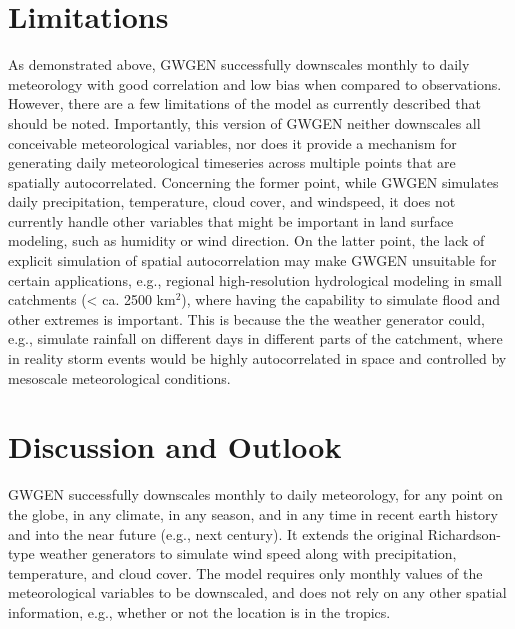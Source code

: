 \documentclass[
11pt, %
english, %
singlespacing, %
headsepline, %
]{MastersDoctoralThesis} %
\begin{document}
\begin{NoHyper}
\begin{refsection}
\section{Limitations} \label{sec:limits}
As demonstrated above, GWGEN successfully downscales monthly to daily meteorology with good correlation and low bias when compared to observations. However, there are a few limitations of the model as currently described that should be noted. Importantly, this version of GWGEN neither downscales all conceivable meteorological variables, nor does it provide a mechanism for generating daily meteorological timeseries across multiple points that are spatially autocorrelated. Concerning the former point, while GWGEN simulates daily precipitation, temperature, cloud cover, and windspeed, it does not currently handle other variables that might be important in land surface modeling, such as humidity or wind direction. On the latter point, the lack of explicit simulation of spatial autocorrelation may make GWGEN unsuitable for certain applications, e.g., regional high-resolution hydrological modeling in small catchments (< ca. 2500 km$^2$), where having the capability to simulate flood and other extremes is important. This is because the the weather generator could, e.g., simulate rainfall on different days in different parts of the catchment, where in reality storm events would be highly autocorrelated in space and controlled by mesoscale meteorological conditions.

\section{Discussion and Outlook} \label{sec:discussion}
GWGEN successfully downscales monthly to daily meteorology, for any point on the globe, in any climate, in any season, and in any time in recent earth history and into the near future (e.g., next century). It extends the original Richardson-type weather generators to simulate wind speed along with precipitation, temperature, and cloud cover. The model requires only monthly values of the meteorological variables to be downscaled, and does not rely on any other spatial information, e.g., whether or not the location is in the tropics.


\end{refsection}
\end{NoHyper}
\end{document}
